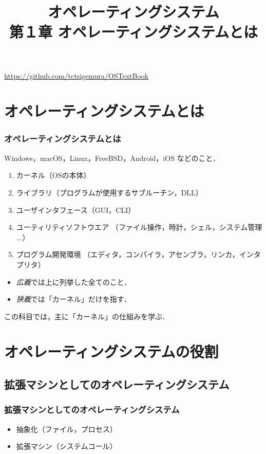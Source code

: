 \documentclass[unicode,handout]{beamer}                   %
\begin{document}
\title[オペレーティングシステムとは]
      {オペレーティングシステム\\第１章 オペレーティングシステムとは}
\date{}
\begin{frame}
  \titlepage
  \centerline{\url{https://github.com/tctsigemura/OSTextBook}}
\end{frame}


\section{オペレーティングシステムとは}
\begin{frame}
  \frametitle{オペレーティングシステムとは}
  Windows，macOS，Linux，FreeBSD，Android，iOS などのこと．
  \begin{enumerate}
  \item[1.] カーネル（OSの本体）
  \item[2.] ライブラリ（プログラムが使用するサブルーチン，DLL）
  \item[3.] ユーザインタフェース（GUI，CLI）
  \item[4.] ユーティリティソフトウエア
    （ファイル操作，時計，シェル，システム管理 ...）
  \item[5.] プログラム開発環境
    （エディタ，コンパイラ，アセンブラ，リンカ，インタプリタ）
  \end{enumerate}

  \begin{itemize}
  \item \emph{広義}では上に列挙した全てのこと．
  \item \emph{狭義}では「カーネル」だけを指す．
  \end{itemize}
  この科目では，主に「カーネル」の仕組みを学ぶ．
  \vfill
\end{frame}

\section{オペレーティングシステムの役割}
\subsection{拡張マシンとしてのオペレーティングシステム}
\begin{frame}
  \frametitle{拡張マシンとしてのオペレーティングシステム}
  \begin{itemize}
    \item 抽象化（ファイル，プロセス）
    \item 拡張マシン（システムコール）
  \end{itemize}
\end{frame}
\end{document}
